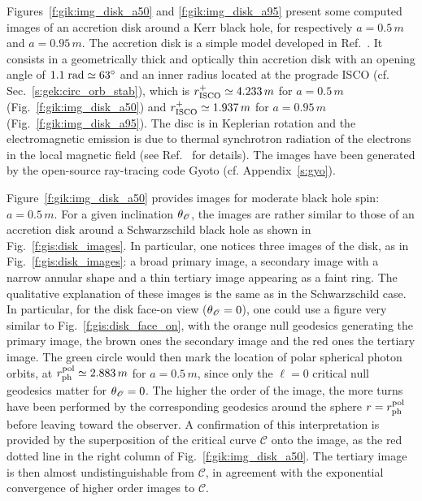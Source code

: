 Figures~\ref{f:gik:img_disk_a50} and \ref{f:gik:img_disk_a95}
present some computed images of an accretion disk around a Kerr black hole,
for respectively $a=0.5\, m$ and $a=0.95\, m$.
The accretion disk is a simple model developed in Ref.~\cite{VinceWAGLPG21}.
It consists in a geometrically thick and optically thin accretion disk with
an opening angle of $1.1\; {\rm rad} \simeq 63^\circ$ and an inner radius located at the prograde
ISCO (cf. Sec.~\ref{s:gek:circ_orb_stab}), which is
$r_{\rm ISCO}^+ \simeq 4.233 \, m$
for $a=0.5\, m$ (Fig.~\ref{f:gik:img_disk_a50})
and
$r_{\rm ISCO}^+ \simeq 1.937\, m$
for $a=0.95\, m$ (Fig.~\ref{f:gik:img_disk_a95}). The disc is in Keplerian rotation
and the electromagnetic emission is due to thermal synchrotron radiation
of the electrons in the local magnetic field (see Ref.~\cite{VinceWAGLPG21} for details).
The images have been generated by the open-source ray-tracing code
\textsf{Gyoto} \cite{VincePGP11} (cf. Appendix~\ref{s:gyo}).

Figure~\ref{f:gik:img_disk_a50} provides images for moderate black hole spin: $a = 0.5\, m$.
For a given inclination $\theta_{\mathscr{O}}$, the images are rather similar to those
of an accretion disk around a Schwarzschild
black hole as shown in Fig.~\ref{f:gis:disk_images}. In particular, one notices
three images of the disk, as in Fig.~\ref{f:gis:disk_images}: a broad primary image,
a secondary image with a narrow annular shape
and a thin tertiary image appearing as a faint ring.
The qualitative explanation of these images is the same as in the Schwarzschild case.
In particular, for the disk face-on view ($\theta_{\mathscr{O}} = 0$), one could
use a figure very similar to Fig.~\ref{f:gis:disk_face_on}, with the
orange null geodesics generating the primary image, the brown ones
the secondary image and the red ones the tertiary image. The green circle
would then mark the location of polar spherical photon orbits,
at $r_{\rm ph}^{\rm pol} \simeq 2.883\, m$ for $a=0.5\, m$,
since only the $\ell=0$ critical null geodesics matter for $\theta_{\mathscr{O}} = 0$.
The higher the order of the image, the more turns have been performed by the
corresponding geodesics around the sphere $r=r_{\rm ph}^{\rm pol}$ before
leaving toward the observer.
A confirmation of this interpretation is provided by the superposition
of the critical curve $\mathscr{C}$ onto the image, as the red dotted line in the
right column of Fig.~\ref{f:gik:img_disk_a50}. The tertiary image is then
almost undistinguishable from $\mathscr{C}$, in agreement with the exponential
convergence of higher order images to $\mathscr{C}$.

